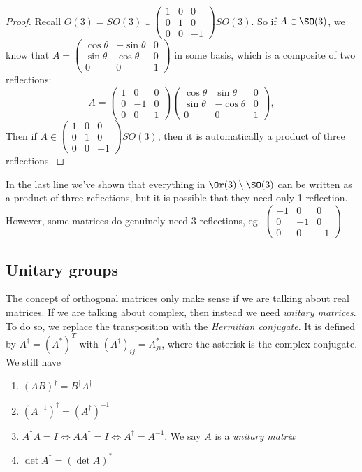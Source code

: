 \documentclass[a4paper]{article}
\begin{document}
\begin{proof}
  Recall $O(3) = SO(3) \cup
  \begin{pmatrix}
    1 & 0 & 0\\
    0 & 1 & 0\\
    0 & 0 & -1
  \end{pmatrix}SO(3)$.
  So if $A\in \SO(3)$, we know that $A =
  \begin{pmatrix}
    \cos\theta & -\sin\theta & 0\\
    \sin\theta & \cos\theta & 0\\
    0 & 0 & 1
  \end{pmatrix}$ in some basis, which is a composite of two reflections:
  \[
    A =
    \begin{pmatrix}
      1 & 0 & 0\\
      0 & -1 & 0\\
      0 & 0 & 1
    \end{pmatrix}
    \begin{pmatrix}
      \cos\theta & \sin\theta & 0\\
      \sin\theta & -\cos\theta & 0\\
      0 & 0 & 1
    \end{pmatrix},
  \]
  Then if $A\in \begin{pmatrix}
    1 & 0 & 0\\
    0 & 1 & 0\\
    0 & 0 & -1
  \end{pmatrix}SO(3)$, then it is automatically a product of three reflections.
\end{proof}
In the last line we've shown that everything in $\Or(3)\setminus \SO(3)$ can be written as a product of three reflections, but it is possible that they need only 1 reflection. However, some matrices do genuinely need 3 reflections, eg.
$\begin{pmatrix}
  -1 & 0 & 0\\
  0 & -1 & 0\\
  0 & 0 & -1
\end{pmatrix}$

\subsection{Unitary groups}
The concept of orthogonal matrices only make sense if we are talking about real matrices. If we are talking about complex, then instead we need \emph{unitary matrices}. To do so, we replace the transposition with the \emph{Hermitian conjugate}. It is defined by $A^\dagger = (A^*)^T$ with $(A^\dagger)_{ij} = A_{ji}^*$, where the asterisk is the complex conjugate. We still have
\begin{enumerate}
  \item $(AB)^\dagger = B^\dagger A^\dagger$
  \item $(A^{-1})^\dagger = (A^\dagger)^{-1}$
  \item $A^\dagger A = I \Leftrightarrow AA^\dagger = I \Leftrightarrow A^\dagger = A^{-1}$. We say $A$ is a \emph{unitary matrix}
  \item $\det A^{\dagger} = (\det A)^*$
\end{enumerate}
\end{document}

